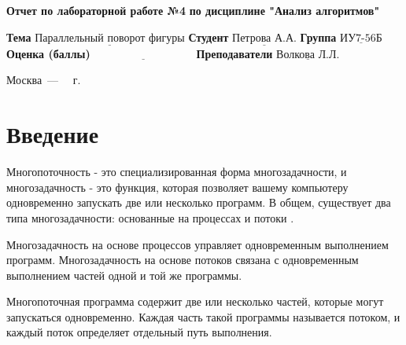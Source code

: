 \documentclass[12pt]{report}
\begin{document}
\begin{titlepage}
		
		\begin{center}
			\noindent\begin{minipage}{1.3\textwidth}\centering
				\Large\textbf{  Отчет по лабораторной работе №4}\newline
				\textbf{по дисциплине "Анализ алгоритмов"}\newline\newline
			\end{minipage}
		\end{center}
		
		\noindent\textbf{Тема} $\underline{\text{Параллельный поворот фигуры}}$\newline\newline
		\noindent\textbf{Студент} $\underline{\text{Петрова А.А.}}$\newline\newline
		\noindent\textbf{Группа} $\underline{\text{ИУ7-56Б}}$\newline\newline
		\noindent\textbf{Оценка (баллы)} $\underline{\text{~~~~~~~~~~~~~~~~~~~~~~~~~~~}}$\newline\newline
		\noindent\textbf{Преподаватели} $\underline{\text{Волкова Л.Л.}}$\newline\newline\newline
		
		\begin{center}
			\vfill
			Москва~---~\the\year
			~г.
		\end{center}
	\end{titlepage}
	
	
	\tableofcontents
	
	\newpage
	\chapter*{Введение}
	Многопоточность - это специализированная форма многозадачности, и многозадачность - это функция, которая позволяет вашему компьютеру одновременно запускать две или несколько программ. В общем, существует два типа многозадачности: основанные на процессах и потоки \cite{wil}.
	
	Многозадачность на основе процессов управляет одновременным выполнением программ. Многозадачность на основе потоков связана с одновременным выполнением частей одной и той же программы.
	
	Многопоточная программа содержит две или несколько частей, которые могут запускаться одновременно. Каждая часть такой программы называется потоком, и каждый поток определяет отдельный путь выполнения.
\end{document}

